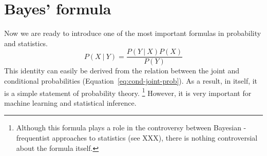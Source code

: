 \section{\label{sec:prob-bayes}Bayes' formula}

Now we are ready to introduce one of the most important formulas
in probability and statistics.
\[
  P(X\:\vert\:Y) = \frac{P(Y\:\vert\:X) P(X)}{P(Y)}
\]
This identity can easily be derived from
the relation between the joint and conditional probabilities
(Equation~\ref{eq:cond-joint-prob}).
As a result, in itself, it is a simple statement of probability theory.%
\footnote{%
  Although this formula plays a role in the controversy 
  between Bayesian - frequentist approaches to statistics
  (see XXX),
  there is nothing controversial about the formula itself.
}
However, it is very important for machine learning and statistical inference.

